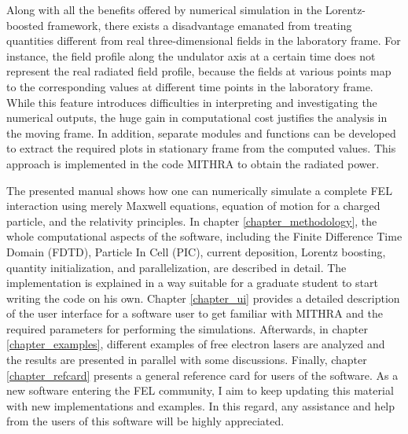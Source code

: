 Along with all the benefits offered by numerical simulation in the Lorentz-boosted framework, there exists a disadvantage emanated from treating quantities different from real three-dimensional fields in the laboratory frame.
%
For instance, the field profile along the undulator axis at a certain time does not represent the real radiated field profile, because the fields at various points map to the corresponding values at different time points in the laboratory frame.
%
While this feature introduces difficulties in interpreting and investigating the numerical outputs, the huge gain in computational cost justifies the analysis in the moving frame.
%
In addition, separate modules and functions can be developed to extract the required plots in stationary frame from the computed values.
%
This approach is implemented in the code MITHRA to obtain the radiated power.

The presented manual shows how one can numerically simulate a complete FEL interaction using merely Maxwell equations, equation of motion for a charged particle, and the relativity principles.
%
In chapter \ref{chapter_methodology}, the whole computational aspects of the software, including the Finite Difference Time Domain (FDTD), Particle In Cell (PIC), current deposition, Lorentz boosting, quantity initialization, and parallelization, are described in detail.
%
The implementation is explained in a way suitable for a graduate student to start writing the code on his own.
%
Chapter \ref{chapter_ui} provides a detailed description of the user interface for a software user to get familiar with MITHRA and the required parameters for performing the simulations.
%
Afterwards, in chapter \ref{chapter_examples}, different examples of free electron lasers are analyzed and the results are presented in parallel with some discussions.
%
Finally, chapter \ref{chapter_refcard} presents a general reference card for users of the software.
%
As a new software entering the FEL community, I aim to keep updating this material with new implementations and examples.
%
In this regard, any assistance and help from the users of this software will be highly appreciated.
